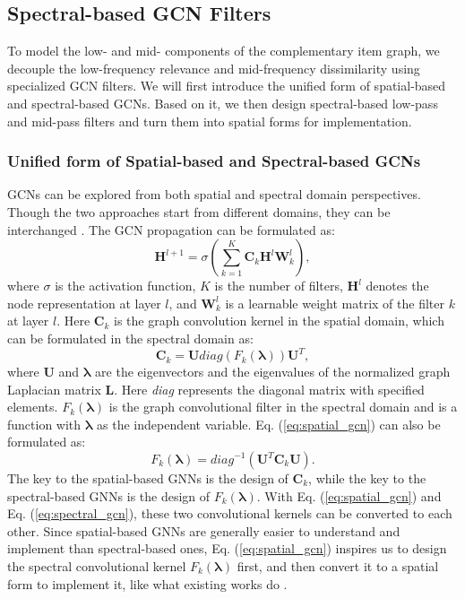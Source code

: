 \documentclass[letterpaper]{article} %
\newcommand{\suhang}[1]{\textcolor{blue}{SW: #1}}
\begin{document}
\subsection{Spectral-based GCN Filters}
\label{sec:filter}
To model the low- and mid- components of the complementary item graph, we decouple the low-frequency relevance and mid-frequency dissimilarity using specialized GCN filters. We will first introduce the unified form of spatial-based and spectral-based GCNs. Based on it, we then design spectral-based low-pass and mid-pass filters and turn them into spatial forms for implementation.

\subsubsection{Unified form of Spatial-based and Spectral-based GCNs}
GCNs can be explored from both spatial and spectral domain perspectives. Though the two approaches start from different domains, they can be interchanged \cite{balcilar2020bridging}. The GCN propagation can be formulated as:
\begin{equation}
\mathbf{H}^{l+1}=\sigma(\sum_{k=1}^{K}\mathbf{C}_{k}\mathbf{H}^{l}\mathbf{W}^{l}_{k}),
\end{equation}
where $\sigma$ is the activation function, $K$ is the number of filters, $\mathbf{H}^{l}$ denotes the node representation at layer $l$, and $\mathbf{W}^{l}_{k}$ is a learnable weight matrix of the filter $k$ at layer $l$. Here $\mathbf{C}_{k}$ is the graph convolution kernel in the spatial domain, which can be formulated in the spectral domain as:
\begin{equation}
    \mathbf{C}_{k}=\mathbf{U}\textit{diag}(F_{k}(\mathbf{\mathbf{\lambda}}))\mathbf{U}^T,
    \label{eq:spatial_gcn}
\end{equation}
where $\mathbf{U}$ and $\mathbf{\lambda}$ are the eigenvectors and the eigenvalues of the normalized graph Laplacian matrix $\mathbf{L}$. Here \textit{diag} represents the diagonal matrix with specified elements. $F_{k}(\mathbf{\lambda})$ is the graph convolutional filter in the spectral domain and is a function with $\mathbf{\lambda}$ as the independent variable. Eq. (\ref{eq:spatial_gcn}) can also be formulated as:%
\begin{equation}
    F_{k}(\mathbf{\lambda}) = \textit{diag}^{-1}(\mathbf{U}^T\mathbf{C}_{k}\mathbf{U}).
    \label{eq:spectral_gcn}
\end{equation}
The key to the spatial-based GNNs is the design of $\mathbf{C}_{k}$, while the key to the spectral-based GNNs is the design of $F_{k}(\mathbf{\lambda})$. With Eq. (\ref{eq:spatial_gcn}) and Eq. (\ref{eq:spectral_gcn}), these two convolutional kernels can be converted to each other. Since spatial-based GNNs are generally easier to understand and implement than spectral-based ones, Eq. (\ref{eq:spatial_gcn}) inspires us to design the spectral convolutional kernel $F_{k}(\mathbf{\lambda})$ first, and then convert it to a spatial form to implement it, like what existing works do \cite{kipf2016semi, wu2022beyond}.
\end{document}
